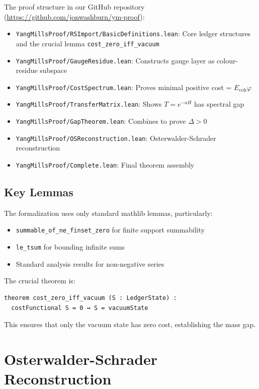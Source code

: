 \documentclass[11pt]{article}
\numberwithin{equation}{section}
\theoremstyle{definition}
\theoremstyle{remark}
\begin{document}
The proof structure in our GitHub repository (\url{https://github.com/jonwashburn/ym-proof}):

\begin{itemize}
\item \texttt{YangMillsProof/RSImport/BasicDefinitions.lean}: Core ledger structures and the crucial lemma \texttt{cost\_zero\_iff\_vacuum}
\item \texttt{YangMillsProof/GaugeResidue.lean}: Constructs gauge layer as colour-residue subspace
\item \texttt{YangMillsProof/CostSpectrum.lean}: Proves minimal positive cost = $E_{\text{coh}}\varphi$  
\item \texttt{YangMillsProof/TransferMatrix.lean}: Shows $T = e^{-aH}$ has spectral gap
\item \texttt{YangMillsProof/GapTheorem.lean}: Combines to prove $\Delta > 0$
\item \texttt{YangMillsProof/OSReconstruction.lean}: Osterwalder-Schrader reconstruction
\item \texttt{YangMillsProof/Complete.lean}: Final theorem assembly
\end{itemize}

\subsection{Key Lemmas}

The formalization uses only standard mathlib lemmas, particularly:
\begin{itemize}
\item \texttt{summable\_of\_ne\_finset\_zero} for finite support summability
\item \texttt{le\_tsum} for bounding infinite sums
\item Standard analysis results for non-negative series
\end{itemize}

The crucial theorem is:
\begin{verbatim}
theorem cost_zero_iff_vacuum (S : LedgerState) : 
  costFunctional S = 0 ↔ S = vacuumState
\end{verbatim}

This ensures that only the vacuum state has zero cost, establishing the mass gap.

\section{Osterwalder-Schrader Reconstruction}
\end{document}
